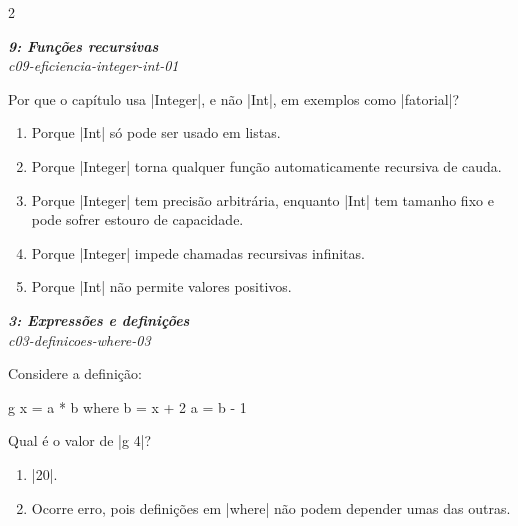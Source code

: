 \documentclass[a4paper,10pt,brazil]{article}
\begin{document}
\begin{multicols}{2}
\begin{enumerate}
\end{enumerate}

\begin{flushright}
  \footnotesize
  \textit{\textbf{9: Funções recursivas}}\\
  \textit{c09-eficiencia-integer-int-01}\\

\end{flushright}
Por que o capítulo usa \haskellinline|Integer|, e não \haskellinline|Int|, em exemplos como \haskellinline|fatorial|?

\begin{enumerate}
  \item Porque \haskellinline|Int| só pode ser usado em listas.

  \item Porque \haskellinline|Integer| torna qualquer função automaticamente recursiva de cauda.

  \item Porque \haskellinline|Integer| tem precisão arbitrária, enquanto \haskellinline|Int| tem tamanho fixo e pode sofrer estouro de capacidade.

  \item Porque \haskellinline|Integer| impede chamadas recursivas infinitas.

  \item Porque \haskellinline|Int| não permite valores positivos.


\end{enumerate}

\begin{flushright}
  \footnotesize
  \textit{\textbf{3: Expressões e definições}}\\
  \textit{c03-definicoes-where-03}\\

\end{flushright}
Considere a definição:

\begin{haskellcode}
g x = a * b
  where
    b = x + 2
    a = b - 1
\end{haskellcode}

Qual é o valor de \haskellinline|g 4|?

\begin{enumerate}
  \item \haskellinline|20|.

  \item Ocorre erro, pois definições em \haskellinline|where| não podem depender umas das outras.


\end{enumerate}
\end{multicols}
\end{document}
